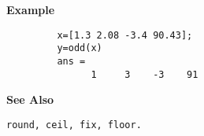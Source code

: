 {\bf \large {}\selectfont Example}
\begin{verbatim}
         x=[1.3 2.08 -3.4 90.43]; 
         y=odd(x)
         ans = 
               1     3    -3    91

\end{verbatim}
\vspace*{.5cm}

{\bf \large {}\selectfont See Also}\\
\hspace*{1.5cm}
\begin{minipage}[t]{13.5cm}
\begin{verbatim}
round, ceil, fix, floor.
\end{verbatim}
\end{minipage}

